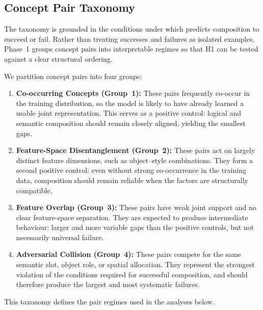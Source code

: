 \subsection{Concept Pair Taxonomy}
\label{subsec:taxonomy}

The taxonomy is grounded in the conditions under which \citet{mechanisms2025projective} predicts composition to succeed or fail. Rather than treating successes and failures as isolated examples, Phase~1 groups concept pairs into interpretable regimes so that H1 can be tested against a clear structural ordering.

We partition concept pairs into four groups:
\begin{enumerate}

    \item \textbf{Co-occurring Concepts (Group~1):}
    These pairs frequently co-occur in the training distribution, so the model is likely to have already learned a usable joint representation. This serves as a positive control: logical and semantic composition should remain closely aligned, yielding the smallest gaps.

    \item \textbf{Feature-Space Disentanglement (Group~2):}
    These pairs act on largely distinct feature dimensions, such as object--style combinations. They form a second positive control: even without strong co-occurrence in the training data, composition should remain reliable when the factors are structurally compatible.

    \item \textbf{Feature Overlap (Group~3):}
    These pairs have weak joint support and no clear feature-space separation. They are expected to produce intermediate behaviour: larger and more variable gaps than the positive controls, but not necessarily universal failure.


    \item \textbf{Adversarial Collision (Group~4):}
    These pairs compete for the same semantic slot, object role, or spatial allocation. They represent the strongest violation of the conditions required for successful composition, and should therefore produce the largest and most systematic failures.

\end{enumerate}
This taxonomy defines the pair regimes used in the analyses below.

